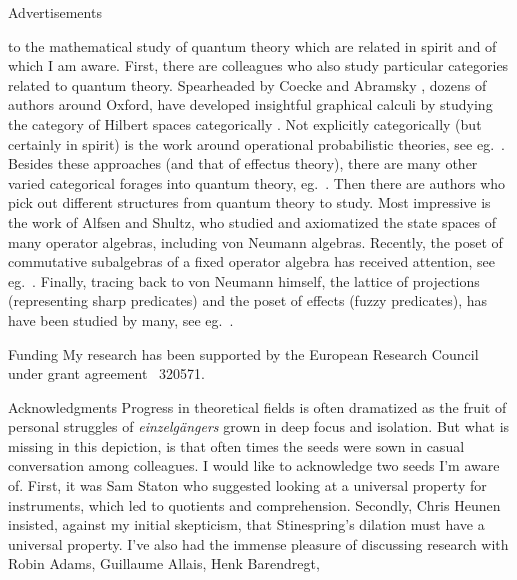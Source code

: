 \begin{parsec}
\begin{point}{Advertisements}
\begin{point}
    to the mathematical study of quantum theory
        which are related in spirit and of which I am aware.
First, there are colleagues who also study particular categories
    related to quantum theory.
Spearheaded by Coecke and Abramsky \cite{abramsky2004categorical},
    dozens of authors around Oxford,
    have developed insightful graphical calculi
    by studying the category of Hilbert spaces
    categorically \cite{coecke2017picturing}.
Not explicitly categorically (but certainly in spirit)
    is the work around operational probabilistic theories,
    see eg.~\cite{DAriano2016}.
Besides these approaches (and that of effectus theory),
    there are many other varied categorical forages
    into quantum theory, eg.~\cite{kornell2012,rennela2017infinite,staton,furber2013kleisli}.
Then there are authors who pick out different structures from quantum theory
    to study.
Most impressive is the work of Alfsen and Shultz,
    who studied and axiomatized the state
    spaces of many operator algebras, including von Neumann algebras. \cite{alfsen2012}
Recently, the poset of commutative subalgebras of a fixed operator algebra
    has received attention,
    see eg.~\cite{heunen2015domains,bert,heunen2012bohrification}.
Finally,
    tracing back to von Neumann himself,
    the lattice of projections (representing sharp predicates)
    and the poset of effects (fuzzy predicates),
    has have been studied by many, see eg.~\cite{dvurecenskij2013new}.
\end{point}
\end{point}
\begin{point}{Funding}
My research has been supported by the
European Research Council under grant agreement \textnumero~320571.
\end{point}
\begin{point}{Acknowledgments}%
Progress in theoretical fields
    is often dramatized
    as the fruit of personal struggles of  \emph{einzelg\"angers}
    grown in deep focus and isolation.
But what is missing in this depiction, is that
    often times  the seeds were sown
    in casual conversation among colleagues.
I would like to acknowledge two seeds I'm aware of.
First, it was Sam Staton who suggested looking at a universal property
    for instruments, which led to quotients and comprehension.
Secondly, Chris Heunen insisted,
    against my initial skepticism,
    that Stinespring's dilation must have a
    universal property.
I've also had the immense pleasure of discussing research with
    Robin Adams,
    Guillaume Allais,
    Henk Barendregt,

\end{point}
\end{parsec}
